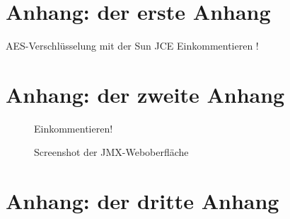\documentclass[12pt,oneside,a4paper,bibtotoc,liststotoc,pointlessnumbers]{scrartcl}
\begin{document}
\begin{appendix}



\section{Anhang: der erste Anhang}
AES-Verschlüsselung mit der Sun JCE
Einkommentieren !
%
%
%


\newpage


\section{Anhang: der zweite Anhang}
\begin{figure}[h]					
\centering
Einkommentieren!
\caption{Screenshot der JMX-Weboberfläche}		%
\label{fig:Fabrikmethode}							%
\end{figure} 	\vspace{-12pt}

\newpage



\newpage
\section{Anhang: der dritte Anhang}


\end{appendix}
\end{document}
